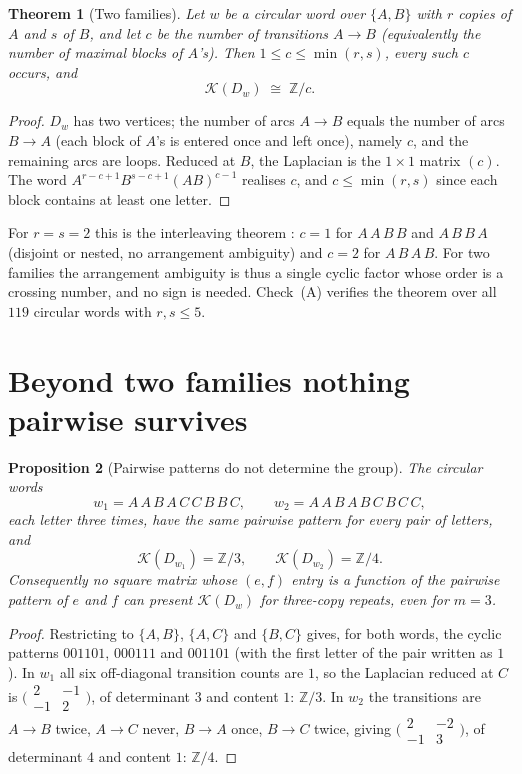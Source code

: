 \documentclass[11pt]{article}
\theoremstyle{plain}
\newtheorem{theorem}{Theorem}
\newtheorem{proposition}[theorem]{Proposition}
\theoremstyle{definition}
\theoremstyle{remark}
\newcommand{\Z}{\mathbb{Z}}
\newcommand{\K}{\mathcal{K}}
\begin{document}
\begin{theorem}[Two families]\label{thm:two}
Let $w$ be a circular word over $\{A,B\}$ with $r$ copies of $A$ and $s$ of $B$, and let
$c$ be the number of transitions $A\to B$ (equivalently the number of maximal blocks of
$A$'s). Then $1\le c\le\min(r,s)$, every such $c$ occurs, and
\[
\K(D_w)\;\cong\;\Z/c .
\]
\end{theorem}

\begin{proof}
$D_w$ has two vertices; the number of arcs $A\to B$ equals the number of arcs $B\to A$
(each block of $A$'s is entered once and left once), namely $c$, and the remaining arcs
are loops. Reduced at $B$, the Laplacian is the $1\times1$ matrix $(c)$. The word
$A^{r-c+1}B^{s-c+1}(AB)^{c-1}$ realises $c$, and $c\le\min(r,s)$ since each block
contains at least one letter.
\end{proof}

For $r=s=2$ this is the interleaving theorem \cite[Thm.~6]{Bio1}: $c=1$ for
$A\,A\,B\,B$ and $A\,B\,B\,A$ (disjoint or nested, no arrangement ambiguity) and $c=2$
for $A\,B\,A\,B$. For two families the arrangement ambiguity is thus a single cyclic
factor whose order is a crossing number, and no sign is needed. Check~(A) verifies the
theorem over all $119$ circular words with $r,s\le5$.

\section{Beyond two families nothing pairwise survives}\label{sec:neg}

\begin{proposition}[Pairwise patterns do not determine the group]\label{prop:pair}
The circular words
\[
w_1=A\,A\,B\,A\,C\,C\,B\,B\,C,\qquad w_2=A\,A\,B\,A\,B\,C\,B\,C\,C,
\]
each letter three times, have the same pairwise pattern for every pair of letters, and
\[
\K(D_{w_1})=\Z/3,\qquad \K(D_{w_2})=\Z/4 .
\]
Consequently no square matrix whose $(e,f)$ entry is a function of the pairwise pattern
of $e$ and $f$ can present $\K(D_w)$ for three-copy repeats, even for $m=3$.
\end{proposition}

\begin{proof}
Restricting to $\{A,B\}$, $\{A,C\}$ and $\{B,C\}$ gives, for both words, the cyclic
patterns $001101$, $000111$ and $001101$ (with the first letter of the pair written as
$1$). In $w_1$ all six off-diagonal transition counts are $1$, so the Laplacian reduced
at $C$ is $\bigl(\begin{smallmatrix}2&-1\\-1&2\end{smallmatrix}\bigr)$, of determinant
$3$ and content $1$: $\Z/3$. In $w_2$ the transitions are $A\to B$ twice, $A\to C$
never, $B\to A$ once, $B\to C$ twice, giving
$\bigl(\begin{smallmatrix}2&-2\\-1&3\end{smallmatrix}\bigr)$, of determinant $4$ and
content $1$: $\Z/4$.
\end{proof}
\end{document}
